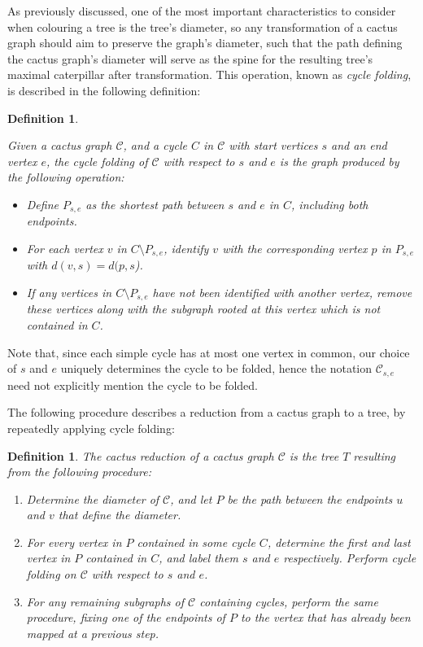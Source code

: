 \documentclass{mpaper}
\newtheorem{definition}[theorem]{Definition}
\begin{document}
As previously discussed, one of the most important characteristics to consider when colouring a tree is the tree's diameter, so any transformation of a cactus graph should aim to preserve the graph's diameter, such that the path defining the cactus graph's diameter will serve as the spine for the resulting tree's maximal caterpillar after transformation. This operation, known as \emph{cycle folding}, is described in the following definition:

\begin{definition}
\label{def/cycle-folding}


Given a cactus graph $\mathcal{C}$, and a cycle $C$ in $\mathcal{C}$ with start vertices $s$ and an end vertex $e$, the \emph{cycle folding} of $\mathcal{C}$ with respect to $s$ and $e$ is the graph produced by the following operation:

\begin{itemize}
  \item Define $P_{s,e}$ as the shortest path between $s$ and $e$ in $C$, including both endpoints.
  \item For each vertex $v$ in $C \setminus P_{s,e}$, identify $v$ with the corresponding vertex $p$ in $P_{s,e}$ with $d(v,s) = d(p,s$).
  \item If any vertices in $C \setminus P_{s,e}$ have not been identified with another vertex, remove these vertices along with the subgraph rooted at this vertex which is not contained in $C$.
\end{itemize}

\end{definition}

Note that, since each simple cycle has at most one vertex in common, our choice of $s$ and $e$ uniquely determines the cycle to be folded, hence the notation $\mathcal{C}_{s,e}$ need not explicitly mention the cycle to be folded.

The following procedure describes a reduction from a cactus graph to a tree, by repeatedly applying cycle folding:

\begin{definition}
  The \emph{cactus reduction} of a cactus graph $\mathcal{C}$ is the tree $T$ resulting from the following procedure:

  \begin{enumerate}
    \item Determine the diameter of $\mathcal{C}$, and let $P$ be the path between the endpoints $u$ and $v$ that define the diameter.
    \item For every vertex in $P$ contained in some cycle $C$, determine the first and last vertex in $P$ contained in $C$, and label them $s$ and $e$ respectively. Perform cycle folding on $\mathcal{C}$ with respect to $s$ and $e$.
    \item For any remaining subgraphs of $\mathcal{C}$ containing cycles, perform the same procedure, fixing one of the endpoints of $P$ to the vertex that has already been mapped at a previous step.
  \end{enumerate}
\end{definition}
\end{document}
